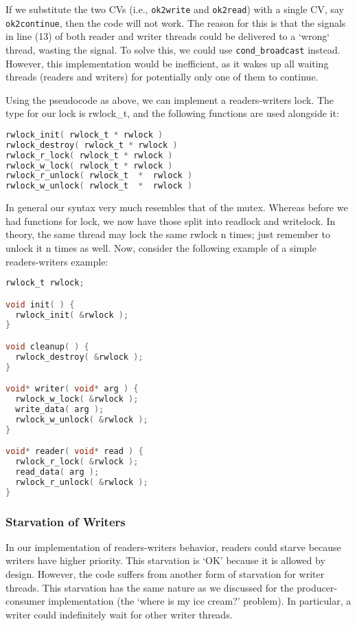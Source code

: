 If we substitute the two CVs (i.e., \texttt{ok2write} and \texttt{ok2read}) with a single CV, say \texttt{ok2continue}, then the code will not work.
The reason for this is that the signals in line (13) of both reader and writer threads could be delivered to a `wrong` thread, wasting the signal.
To solve this, we could use \texttt{cond\_broadcast} instead.
However, this implementation would be inefficient, as it wakes up all waiting threads (readers and writers) for potentially only one of them to continue.


Using the pseudocode as above, we can implement a readers-writers lock.
The type for our lock is rwlock_t, and the following functions are used alongside it:

	\begin{lstlisting}[language=C]
rwlock_init( rwlock_t * rwlock )
rwlock_destroy( rwlock_t * rwlock )
rwlock_r_lock( rwlock_t * rwlock )
rwlock_w_lock( rwlock_t * rwlock )
rwlock_r_unlock( rwlock_t  *  rwlock )
rwlock_w_unlock( rwlock_t  *  rwlock )
	\end{lstlisting}

	In general our syntax very much resembles that of the mutex.
    Whereas before we had functions for lock, we now have those split into readlock and writelock.
    In theory, the same thread may lock the same rwlock n times; just remember to unlock it n times as well.
    Now, consider the following example of a simple readers-writers example:

	\begin{lstlisting}[language=C]
rwlock_t rwlock;

void init( ) {
  rwlock_init( &rwlock );
}

void cleanup( ) {
  rwlock_destroy( &rwlock );
}

void* writer( void* arg ) {
  rwlock_w_lock( &rwlock );
  write_data( arg );
  rwlock_w_unlock( &rwlock );
}

void* reader( void* read ) {
  rwlock_r_lock( &rwlock );
  read_data( arg );
  rwlock_r_unlock( &rwlock );
}
    \end{lstlisting}


\subsubsection*{Starvation of Writers}

In our implementation of readers-writers behavior, readers could starve because writers have higher priority.
This starvation is `OK' because it is allowed by design.
However, the code suffers from another form of starvation for writer threads.
This starvation has the same nature as we discussed for the producer-consumer implementation (the `where is my ice cream?' problem).
In particular, a writer could indefinitely wait for other writer threads.

